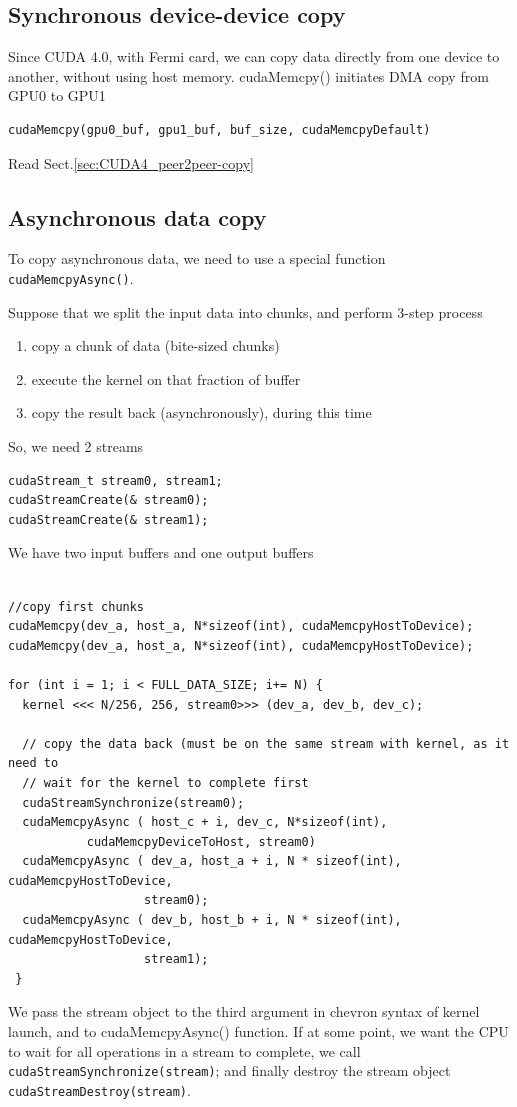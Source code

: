 \subsection{Synchronous device-device copy}
\label{sec:cudac_synch_device2device}

Since CUDA 4.0, with Fermi card, we can copy data directly from one device to
another, without using host memory. cudaMemcpy() initiates DMA copy from GPU0 to
GPU1
\begin{lstlisting}
cudaMemcpy(gpu0_buf, gpu1_buf, buf_size, cudaMemcpyDefault)
\end{lstlisting}
Read Sect.\ref{sec:CUDA4_peer2peer-copy}

\subsection{Asynchronous data copy}
\label{sec:cudac_asynch_datacopy}


To copy asynchronous data, we need to use a special function
\verb!cudaMemcpyAsync()!.

Suppose that we split the input data into chunks, and perform 3-step process
\begin{enumerate}
  \item copy a chunk of data (bite-sized chunks)
  \item execute the kernel on that fraction of buffer
  \item copy the result back (asynchronously), during this time
\end{enumerate}
So, we need 2 streams
\begin{lstlisting}
cudaStream_t stream0, stream1;
cudaStreamCreate(& stream0);
cudaStreamCreate(& stream1);
\end{lstlisting}

We have two input buffers and one output buffers
\begin{lstlisting}

//copy first chunks
cudaMemcpy(dev_a, host_a, N*sizeof(int), cudaMemcpyHostToDevice);
cudaMemcpy(dev_a, host_a, N*sizeof(int), cudaMemcpyHostToDevice);

for (int i = 1; i < FULL_DATA_SIZE; i+= N) {
  kernel <<< N/256, 256, stream0>>> (dev_a, dev_b, dev_c);
  
  // copy the data back (must be on the same stream with kernel, as it need to
  // wait for the kernel to complete first 
  cudaStreamSynchronize(stream0);
  cudaMemcpyAsync ( host_c + i, dev_c, N*sizeof(int),
           cudaMemcpyDeviceToHost, stream0)
  cudaMemcpyAsync ( dev_a, host_a + i, N * sizeof(int), cudaMemcpyHostToDevice,
                   stream0);
  cudaMemcpyAsync ( dev_b, host_b + i, N * sizeof(int), cudaMemcpyHostToDevice,
                   stream1);
 }
\end{lstlisting}
We pass the stream object to the third argument in chevron syntax of kernel
launch, and to cudaMemcpyAsync() function. If at some point, we want the CPU to
wait for all operations in a stream to complete, we call
\verb!cudaStreamSynchronize(stream)!; and finally destroy the stream object
\verb!cudaStreamDestroy(stream)!. 

